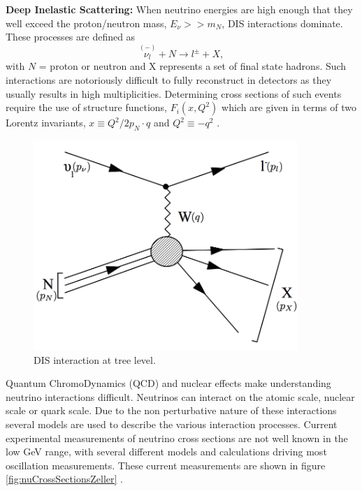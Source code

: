 \textbf{Deep Inelastic Scattering:} When neutrino energies are high enough that they well exceed the proton/neutron mass, $E_{\nu} >> m_{N}$, DIS interactions dominate. These processes are defined as
\begin{equation}
\overset{(-)}{\nu_{l}} + N \rightarrow l^{\pm} + X,
\end{equation}
with $N$ = proton or neutron and X represents a set of final state hadrons. Such interactions are notoriously difficult to fully reconstruct in detectors as they usually results in high multiplicities. Determining cross sections of such events require the use of structure functions, $F_{i}(x,Q^{2})$ which are given in terms of two Lorentz invariants, $x \equiv Q^{2}/2p_{N} \cdot q$ and $Q^{2} \equiv -q^{2}$ \cite{giuntiNeutrino}.

\begin{figure}[htbp]
\begin{center}
\includegraphics[width=100mm]{Introduction/IntroductionFigs/feynmanDiagramsDIS.png}
\caption{DIS interaction at tree level.}
\label{fig:feynmanDiagramDIS}
\end{center}
\end{figure}

Quantum ChromoDynamics (QCD) and nuclear effects make understanding neutrino interactions difficult. Neutrinos can interact on the atomic scale, nuclear scale or quark scale. Due to the non perturbative nature of these interactions several models are used to describe the various interaction processes. Current experimental measurements of neutrino cross sections are not well known in the low GeV range, with several different models and calculations driving most oscillation measurements. These current measurements are shown in figure \ref{fig:nuCrossSectionsZeller} \cite{neutrinoCrossSections}. 

